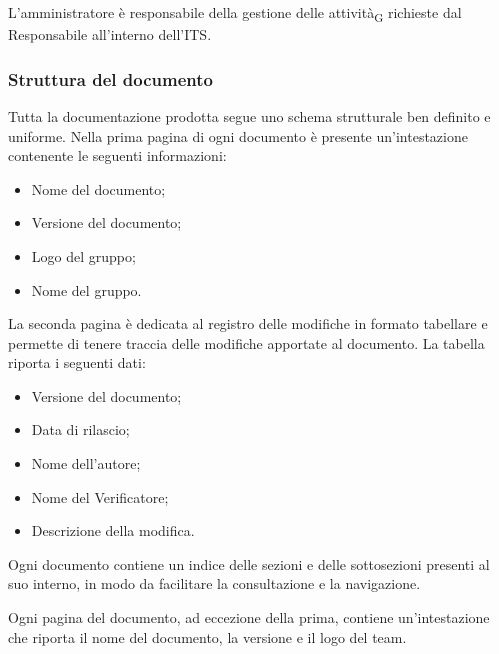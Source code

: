 L'amministratore è responsabile della gestione delle {attività\textsubscript{G}} richieste dal Responsabile all'interno dell'ITS.

\subsubsection{Struttura del documento}
Tutta la documentazione prodotta segue uno schema strutturale ben definito e uniforme.
Nella prima pagina di ogni documento è presente un'intestazione contenente le seguenti informazioni:
\begin{itemize}
    \item Nome del documento;
    \item Versione del documento;
    \item Logo del gruppo;
    \item Nome del gruppo.
\end{itemize}

La seconda pagina è dedicata al registro delle modifiche in formato tabellare e permette di tenere traccia delle modifiche apportate al documento.
La tabella riporta i seguenti dati:
\begin{itemize}
    \item Versione del documento;
    \item Data di rilascio;
    \item Nome dell'autore;
    \item Nome del Verificatore;
    \item Descrizione della modifica.
\end{itemize}

Ogni documento contiene un indice delle sezioni e delle sottosezioni presenti al suo interno, in modo da facilitare la consultazione e la navigazione.

Ogni pagina del documento, ad eccezione della prima, contiene un'intestazione che riporta il nome del documento, la versione e il logo del team.

